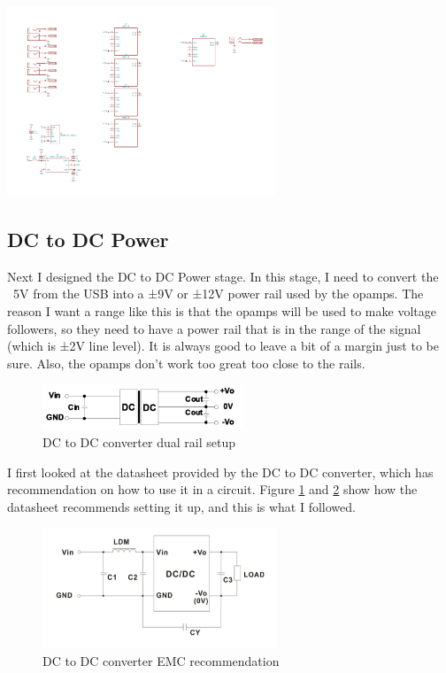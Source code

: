 \documentclass[a4paper]{article}
\begin{document}
\begin{center}
  \includegraphics[trim={2cm 5.5cm 21cm 12.8cm},width=8cm,clip]{images/audio-mixer.pdf}
\end{center}

\subsection{DC to DC Power}

Next I designed the DC to DC Power stage. In this stage, I need to convert the ~5V from the USB into a ±9V or ±12V power rail used by the opamps. The reason I want a range like this is that the opamps will be used to make voltage followers, so they need to have a power rail that is in the range of the signal (which is ±2V line level). It is always good to leave a bit of a margin just to be sure. Also, the opamps don't work too great too close to the rails.

\begin{figure}[h!]
\centering
\includegraphics[width=6cm]{images/pdme-dual}
\caption{DC to DC converter dual rail setup}
\label{fig:pdme-dual}
\end{figure}

I first looked at the datasheet provided by the DC to DC converter, which has recommendation on how to use it in a circuit. Figure \ref{fig:pdme-dual} and \ref{fig:pdme-emc} show how the datasheet recommends setting it up, and this is what I followed.

\begin{figure}[h!]
\centering
\includegraphics[width=7cm]{images/pdme-emc}
\caption{DC to DC converter EMC recommendation}
\label{fig:pdme-emc}
\end{figure}
\end{document}

